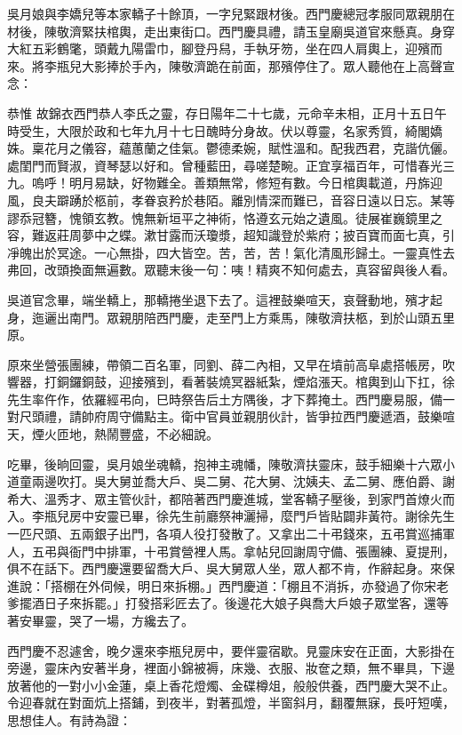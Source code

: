 吳月娘與李嬌兒等本家轎子十餘頂，一字兒緊跟材後。西門慶總冠孝服同眾親朋在材後，陳敬濟緊扶棺輿，走出東街口。西門慶具禮，請玉皇廟吳道官來懸真。身穿大紅五彩鶴氅，頭戴九陽雷巾，腳登丹舄，手執牙笏，坐在四人肩輿上，迎殯而來。將李瓶兒大影捧於手內，陳敬濟跪在前面，那殯停住了。眾人聽他在上高聲宣念：

恭惟 故錦衣西門恭人李氏之靈，存日陽年二十七歲，元命辛未相，正月十五日午時受生，大限於政和七年九月十七日醜時分身故。伏以尊靈，名家秀質，綺閣嬌姝。稟花月之儀容，蘊蕙蘭之佳氣。鬱德柔婉，賦性溫和。配我西君，克諧伉儷。處閨門而賢淑，資琴瑟以好和。曾種藍田，尋嗟楚畹。正宜享福百年，可惜春光三九。嗚呼！明月易缺，好物難全。善類無常，修短有數。今日棺輿載道，丹旆迎風，良夫躃踴於柩前，孝眷哀矜於巷陌。離別情深而難已，音容日遠以日忘。某等謬忝冠簪，愧領玄教。愧無新垣平之神術，恪遵玄元始之遺風。徒展崔巍鏡里之容，難返莊周夢中之蝶。漱甘露而沃瓊漿，超知識登於紫府；披百寶而面七真，引凈魄出於冥途。一心無掛，四大皆空。苦，苦，苦！氣化清風形歸土。一靈真性去弗回，改頭換面無遍數。眾聽末後一句：咦！精爽不知何處去，真容留與後人看。

吳道官念畢，端坐轎上，那轎捲坐退下去了。這裡鼓樂喧天，哀聲動地，殯才起身，迤邐出南門。眾親朋陪西門慶，走至門上方乘馬，陳敬濟扶柩，到於山頭五里原。

原來坐營張團練，帶領二百名軍，同劉、薛二內相，又早在墳前高阜處搭帳房，吹響器，打銅鑼銅鼓，迎接殯到，看著裝燒冥器紙紮，煙焰漲天。棺輿到山下扛，徐先生率仵作，依羅經弔向，巳時祭告后土方隅後，才下葬掩土。西門慶易服，備一對尺頭禮，請帥府周守備點主。衛中官員並親朋伙計，皆爭拉西門慶遞酒，鼓樂喧天，煙火匝地，熱鬧豐盛，不必細說。

吃畢，後晌回靈，吳月娘坐魂轎，抱神主魂幡，陳敬濟扶靈床，鼓手細樂十六眾小道童兩邊吹打。吳大舅並喬大戶、吳二舅、花大舅、沈姨夫、孟二舅、應伯爵、謝希大、溫秀才、眾主管伙計，都陪著西門慶進城，堂客轎子壓後，到家門首燎火而入。李瓶兒房中安靈已畢，徐先生前廳祭神灑掃，麼門戶皆貼闢非黃符。謝徐先生一匹尺頭、五兩銀子出門，各項人役打發散了。又拿出二十弔錢來，五弔賞巡捕軍人，五弔與衙門中排軍，十弔賞營裡人馬。拿帖兒回謝周守備、張團練、夏提刑，俱不在話下。西門慶還要留喬大戶、吳大舅眾人坐，眾人都不肯，作辭起身。來保進說：「搭棚在外伺候，明日來拆棚。」西門慶道：「棚且不消拆，亦發過了你宋老爹擺酒日子來拆罷。」打發搭彩匠去了。後邊花大娘子與喬大戶娘子眾堂客，還等著安畢靈，哭了一場，方纔去了。

西門慶不忍遽舍，晚夕還來李瓶兒房中，要伴靈宿歇。見靈床安在正面，大影掛在旁邊，靈床內安著半身，裡面小錦被褥，床幾、衣服、妝奩之類，無不畢具，下邊放著他的一對小小金蓮，桌上香花燈燭、金碟樽俎，般般供養，西門慶大哭不止。令迎春就在對面炕上搭鋪，到夜半，對著孤燈，半窗斜月，翻覆無寐，長吁短嘆，思想佳人。有詩為證：

